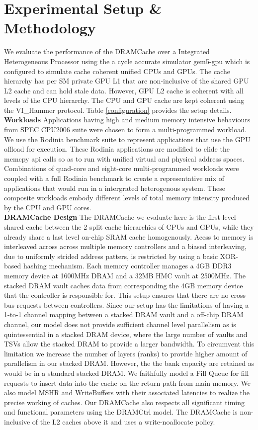 \section{Experimental Setup \& Methodology} \label{methodology}
We evaluate the performance of the DRAMCache over a Integrated Heterogeneous Processor using the a cycle accurate simulator gem5-gpu \cite{gem5-gpu} which is configured to simulate cache coherent unified CPUs and GPUs. The cache hierarchy has per SM private GPU L1  that are non-inclusive of the shared GPU L2 cache and can hold stale data. However, GPU L2 cache is coherent with all levels of the CPU hierarchy. The CPU and GPU cache are kept coherent using the VI\_Hammer protocol. Table \ref{configuration} provides the setup details.\\
\textbf{Workloads} Applications having high and medium memory intensive behaviours from SPEC CPU2006 suite \cite{spec2006} were chosen to form a multi-programmed workload. We use the Rodinia benchmark suite \cite{rodinia} to represent applications that use the GPU offload for execution. These Rodinia applications are modified to elide the memcpy api calls so as to run with unified virtual and physical address spaces. Combinations of quad-core and eight-core multi-programmed workloads were coupled with a full Rodinia benchmark to create a representative mix of applications that would run in a intergrated heterogenous system. These composite workloads embody different levels of total memory intensity produced by the CPU and GPU cores. \\
\textbf{DRAMCache Design} The DRAMCache we evaluate here is the first level shared cache between the 2 split cache hierarchies of CPUs and GPUs, while they already share a last level on-chip SRAM cache homogenously. Acess to memory is interleaved across across multiple memory controllers and a biased interleaving, due to uniformly strided address patters, is restricted by using a basic XOR-based hashing mechanism. Each memory controller manages a 4GB DDR3 memory device at 1600MHz DRAM and a 32MB HMC vault at 2500MHz. The stacked DRAM vault caches data from corresponding the 4GB memory device that the controller is responsible for. This setup ensures that there are no cross bus requests between controllers. Since our setup has the limitations of having a 1-to-1 channel mapping between a stacked DRAM vault and a off-chip DRAM channel, our model does not provide sufficient channel level parallelism as is quintessential in a stacked DRAM device, where the large number of vaults and TSVs allow the stacked DRAM to provide a larger bandwidth. To circumvent this limitation we increase the number of layers (ranks) to provide higher amount of parallelism in our stacked DRAM. However, the the bank capacity are retained as would be in a standard stacked DRAM. We faithfully model a Fill Queue \cite{dca} for fill requests to insert data into the cache on the return path from main memory. We also model MSHR and WriteBuffers with their associated latencies to realize the precise working of caches. Our DRAMCache also respects all significant timing and functional parameters using the DRAMCtrl \cite{dramctrl} model. The DRAMCache is non-inclusive \cite{coherence-dramcache} of the  L2 caches above it and uses a write-noallocate policy.\\
